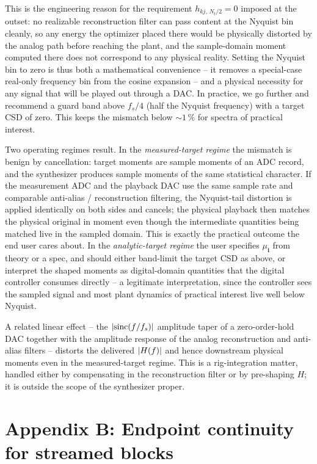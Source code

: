 \documentclass[10pt,a4paper]{article}
\numberwithin{equation}{section}
\DeclarePairedDelimiter\mat{(}{)}
\newcommand{\m}[1]{\mathrm{#1}}
\begin{document}
This is the engineering reason for the requirement $h_{k j,\, N_t/2} = 0$ imposed at the outset: no realizable reconstruction filter can pass content at the Nyquist bin cleanly, so any energy the optimizer placed there would be physically distorted by the analog path before reaching the plant, and the sample-domain moment computed there does not correspond to any physical reality. Setting the Nyquist bin to zero is thus both a mathematical convenience -- it removes a special-case real-only frequency bin from the cosine expansion -- and a physical necessity for any signal that will be played out through a DAC. In practice, we go further and recommend a guard band above $f_s/4$ (half the Nyquist frequency) with a target CSD of zero. This keeps the mismatch below ${\sim}1\,\%$ for spectra of practical interest.

Two operating regimes result. In the \emph{measured-target regime} the mismatch is benign by cancellation: target moments are sample moments of an ADC record, and the synthesizer produces sample moments of the same statistical character. If the measurement ADC and the playback DAC use the same sample rate and comparable anti-alias / reconstruction filtering, the Nyquist-tail distortion is applied identically on both sides and cancels; the physical playback then matches the physical original in moment even though the intermediate quantities being matched live in the sampled domain. This is exactly the practical outcome the end user cares about. In the \emph{analytic-target regime} the user specifies $\mu_\mathbf{i}$ from theory or a spec, and should either band-limit the target CSD as above, or interpret the shaped moments as digital-domain quantities that the digital controller consumes directly -- a legitimate interpretation, since the controller sees the sampled signal and most plant dynamics of practical interest live well below Nyquist.

A related linear effect -- the $|\m{sinc}\mat{f/f_s}|$ amplitude taper of a zero-order-hold DAC together with the amplitude response of the analog reconstruction and anti-alias filters -- distorts the delivered $|H\mat{f}|$ and hence downstream physical moments even in the measured-target regime. This is a rig-integration matter, handled either by compensating in the reconstruction filter or by pre-shaping $H$; it is outside the scope of the synthesizer proper.

\section*{Appendix B: Endpoint continuity for streamed blocks}\label{app:endpoint}
\end{document}
